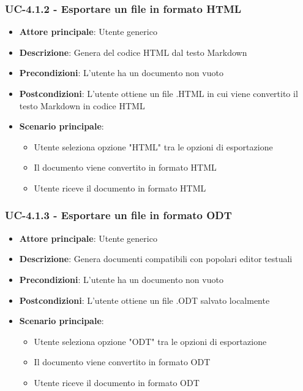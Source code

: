 \documentclass[11pt,a4paper]{article}
\begin{document}
\subsubsection{UC-4.1.2 - Esportare un file in formato HTML}
\begin{itemize}
    \item \textbf{Attore principale}: Utente generico
    \item \textbf{Descrizione}: Genera del codice HTML dal testo Markdown
    \item \textbf{Precondizioni}: L'utente ha un documento non vuoto
    \item \textbf{Postcondizioni}: L'utente ottiene un file .HTML in cui viene convertito il testo Markdown in codice HTML
    \item \textbf{Scenario principale}:
        \begin{itemize}
            \item Utente seleziona opzione "HTML" tra le opzioni di esportazione
            \item Il documento viene convertito in formato HTML
            \item Utente riceve il documento in formato HTML
        \end{itemize}
\end{itemize}

\subsubsection{UC-4.1.3 - Esportare un file in formato ODT}
\begin{itemize}
    \item \textbf{Attore principale}: Utente generico
    \item \textbf{Descrizione}: Genera documenti compatibili con popolari editor testuali
    \item \textbf{Precondizioni}: L'utente ha un documento non vuoto
    \item \textbf{Postcondizioni}: L'utente ottiene un file .ODT salvato localmente
    \item \textbf{Scenario principale}:
        \begin{itemize}
            \item Utente seleziona opzione "ODT" tra le opzioni di esportazione
            \item Il documento viene convertito in formato ODT
            \item Utente riceve il documento in formato ODT
        \end{itemize}
\end{itemize}
\end{document}
